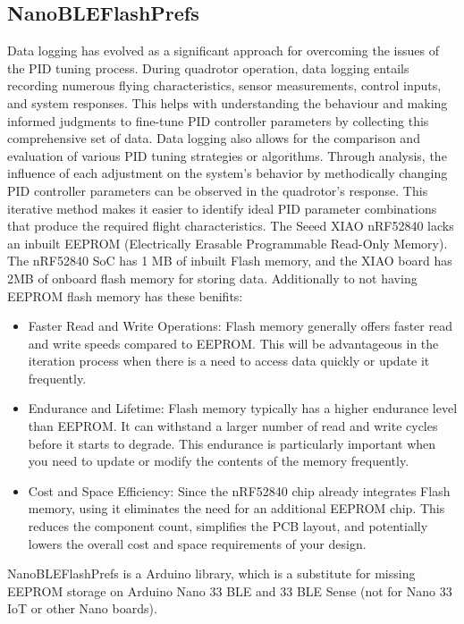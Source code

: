 \subsection{NanoBLEFlashPrefs}\label{flash}
Data logging has evolved as a significant approach for overcoming the issues of the PID tuning process. \cite{PIDlog}
During quadrotor operation, data logging entails recording numerous flying characteristics, sensor measurements, control inputs, and system responses.
This helps with understanding the behaviour and making informed judgments to fine-tune PID controller parameters by collecting this comprehensive set of data. \cite{loggingProof}
Data logging also allows for the comparison and evaluation of various PID tuning strategies or algorithms. 
Through analysis, the influence of each adjustment on the system's behavior by methodically changing PID controller parameters can be observed in the quadrotor's response.
This iterative method makes it easier to identify ideal PID parameter combinations that produce the required flight characteristics.
The Seeed XIAO nRF52840 lacks an inbuilt EEPROM (Electrically Erasable Programmable Read-Only Memory). The nRF52840 SoC has 1 MB of inbuilt Flash memory, and the XIAO board has 2MB of onboard flash memory for storing data. Additionally to not having EEPROM flash memory has these benifits:
\begin{itemize}
    \item
        Faster Read and Write Operations: Flash memory generally offers faster read and write speeds compared to EEPROM.\cite{Sandeep} This will be advantageous in the iteration process when there is a need to access data quickly or update it frequently.
    \item
    	Endurance and Lifetime: Flash memory typically has a higher endurance level than EEPROM. It can withstand a larger number of read and write cycles before it starts to degrade.\cite{Sandeep} This endurance is particularly important when you need to update or modify the contents of the memory frequently.
    \item
    	Cost and Space Efficiency: Since the nRF52840 chip already integrates Flash memory, using it eliminates the need for an additional EEPROM chip. This reduces the component count, simplifies the PCB layout, and potentially lowers the overall cost and space requirements of your design.
\end{itemize}
NanoBLEFlashPrefs is a Arduino library, which is a substitute for missing EEPROM storage on Arduino Nano 33 BLE and 33 BLE Sense (not for Nano 33 IoT or other Nano boards). \cite{FlashPrefs}
